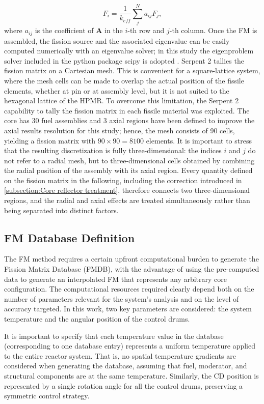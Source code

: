 \documentclass[preprint,review,12pt]{elsarticle}
\newif\ifhighlight
\newcommand{\rthree}[1]{\ifhighlight\textcolor{revthree}{#1}\else#1\fi}
\begin{document}
\begin{equation}
F_i = \frac{1}{k_{eff}}\sum_j^N a_{ij}F_j,
\label{eq:fission_matrix_eigenproblem}
\end{equation}
where $a_{ij}$ is the coefficient of $\textbf{A}$ in the $i$-th row and $j$-th column. Once the FM is assembled, the fission source and the associated eigenvalue can be easily computed numerically with an eigenvalue solver; in this study the eigenproblem solver included in the python package scipy is adopted \cite{2020SciPy-NMeth}.
Serpent 2 tallies the fission matrix on a Cartesian mesh. This is convenient for a square-lattice system, where the mesh cells can be made to overlap the actual position of the fissile elements, whether at pin or at assembly level, but it is not suited to the hexagonal lattice of the HPMR. 
To overcome this limitation, the Serpent 2 capability to tally the fission matrix in each fissile material was exploited. The core has 30 fuel assemblies and 3 axial regions have been defined to improve the axial results resolution for this study; hence, the mesh consists of 90 cells, yielding a fission matrix with $90 \times 90 = 8100$ elements. \rthree{It is important to stress that the resulting discretization is fully three-dimensional: the indices $i$ and $j$ do not refer to a radial mesh, but to three-dimensional cells obtained by combining the radial position of the assembly with its axial region. Every quantity defined on the fission matrix in the following, including the correction introduced in \cref{subsection:Core reflector treatment}, therefore connects two three-dimensional regions, and the radial and axial effects are treated simultaneously rather than being separated into distinct factors.}


\subsection{FM Database Definition} \label{subsection:Database definition}
The FM method requires a certain upfront computational burden to generate the Fission Matrix Database (FMDB), with the advantage of using the pre-computed data to generate an interpolated FM that represents any arbitrary core configuration. The computational resources required clearly depend both on the number of parameters relevant for the system's analysis and on the level of accuracy targeted.
In this work, two key parameters are considered: the system temperature and the angular position of the control drums.

It is important to specify that each temperature value in the database (corresponding to one database entry) represents a uniform temperature applied to the entire reactor system. That is, no spatial temperature gradients are considered when generating the database, assuming that fuel, moderator, and structural components are at the same temperature. Similarly, the CD position is represented by a single rotation angle for all the control drums, preserving a symmetric control strategy.
\end{document}
